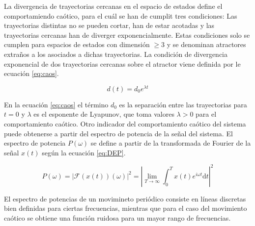 La divergencia de trayectorias cercanas en el espacio de estados define el comportamiendo ca\'otico, para el cu\'al se han de cumplit tres condiciones:  Las trayectorias distintas no se pueden cortar, han de estar acotadas y las trayectorias cercanas han de diverger exponencialmente. Estas condiciones solo se cumplen para espacios de estados con dimensión $\geq 3$ y se denominan atractores extraños a los asociados a dichas trayectorias. La condici\'on de divergencia exponencial de dos trayectorias cercanas sobre el atractor viene definida por le ecuaci\'on \ref{eq:caos}.

	\begin{equation}
		d(t) = d_0 e^{\lambda t}
		\label{eq:caos}
	\end{equation}

En la ecuaci\'on \ref{eq:caos} el t\'ermino $d_0$ es la separaci\'on entre las trayectorias para $t = 0$ y $\lambda$ es el esponente de Lyapunov, que toma valores $\lambda > 0$ para el comportamiento ca\'otico. Otro indicador del comportamiento ca\'otico del sistema puede obtenerse a partir del espectro de potencia de la señal del sistema. El espectro de potencia $P(\omega)$ se define a partir de la transformada de Fourier de la señal $x(t)$ seg\'un la ecuaci\'on \ref{eq:DEP}.

	\begin{equation}
		P(\omega) = |\mathcal{F}(x(t)) (\omega)|^2 = \left|\lim_{T\rightarrow\infty} \int_{0}^{T} x(t) e^{i\omega t} \mathrm{d}t \right| ^2
		\label{eq:DEP}
	\end{equation}

El espectro de potencias de un movimineto peri\'odico consiste en l\'ineas discretas bien definidas para ciertas frecuencias, mientras que para el caso del movimiento ca\'otico se obtiene una funci\'on ruidosa para un mayor rango de frecuencias.
